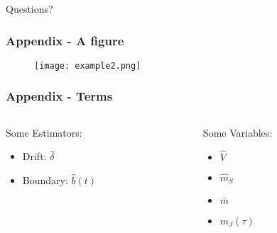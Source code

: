 \documentclass[
    11pt, 
    aspectratio=169, 
]{beamer}
\begin{document}
\appendix
{}

\begin{frame}[noframenumbering] %

	\begin{center}
            {\LARGE Questions?}
	\end{center}
 
\end{frame}

\begin{frame}[noframenumbering]
\label{Figure}
	\frametitle{Appendix - A figure}
        \hyperlink{Test}{}
        
        \begin{figure}[h!]
            \centering
            \texttt{[image: example2.png]}
        \end{figure}
\end{frame}

\begin{frame}[noframenumbering]
\label{Terms}
	\frametitle{Appendix - Terms}

        \begin{columns}[t] %
		\begin{column}{0.5\textwidth} %
                Some Estimators:
                \begin{itemize}
                    \item Drift: $\hat{\delta}$
                    \item Boundary: $\hat{b}(t)$
                \end{itemize}
		\end{column}
  		\begin{column}{0.5\textwidth} %
                Some Variables:
                \begin{itemize}
                    \item $\hat{V}$
                    \item $\hat{m}_S$
                    \item $\bar{m}$
                    \item $m_J(\tau)$\newline\newline
                \end{itemize}
		\end{column}
	\end{columns}
        \hyperlink{Test Stat}{}        
\end{frame}
\end{document}
